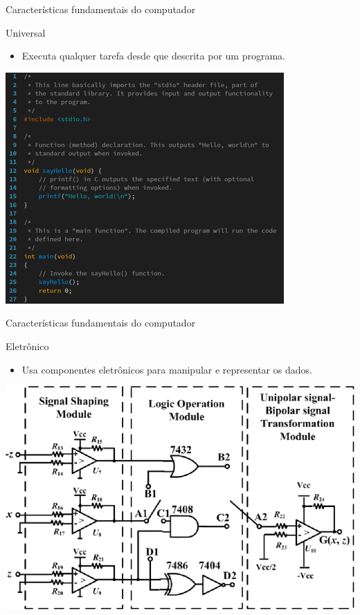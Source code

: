 \begin{frame}{Características fundamentais do computador}
	\begin{block}{Universal}
		\begin{itemize}
			\item Executa qualquer tarefa desde que descrita por um programa.
		\end{itemize}
	\end{block}

	\centering
	\includegraphics[width=0.6\linewidth]{Figuras/Ch01/fig4.1}
\end{frame}


\begin{frame}{Características fundamentais do computador}
	\begin{block}{Eletrônico}
		\begin{itemize}
			\item Usa componentes eletrônicos para manipular e representar os dados.
		\end{itemize}
	\end{block}

	\centering
	\includegraphics[width=0.7\linewidth]{Figuras/Ch01/fig6}
\end{frame}


